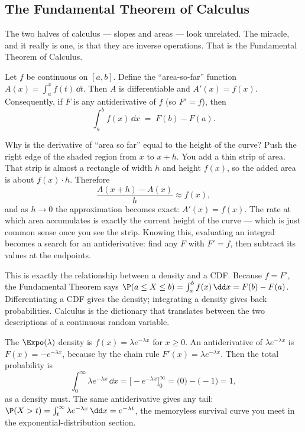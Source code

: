 \subsection{The Fundamental Theorem of Calculus}
\label{chAcla:ftc}

The two halves of calculus --- slopes and areas --- look unrelated. The miracle, and it really is
one, is that they are inverse operations. That is the Fundamental Theorem of Calculus.

\begin{theorem}
\label{chAcla:thm-ftc}
Let $f$ be continuous on $[a,b]$. Define the ``area-so-far'' function
$\displaystyle A(x)=\int_a^x f(t)\,\dd t$. Then $A$ is differentiable and $A'(x)=f(x)$. Consequently,
if $F$ is any antiderivative of $f$ (so $F'=f$), then
\[
  \int_a^b f(x)\,\dd x \;=\; F(b)-F(a).
\]
\end{theorem}

\begin{whybox}
Why is the derivative of ``area so far'' equal to the height of the curve? Push the right edge of the
shaded region from $x$ to $x+h$. You add a thin strip of area. That strip is almost a rectangle of
width $h$ and height $f(x)$, so the added area is about $f(x)\cdot h$. Therefore
\[
  \frac{A(x+h)-A(x)}{h}\approx f(x),
\]
and as $h\to 0$ the approximation becomes exact: $A'(x)=f(x)$. The rate at which area accumulates is
exactly the current height of the curve --- which is just common sense once you see the strip.
Knowing this, evaluating an integral becomes a search for an antiderivative: find any $F$ with
$F'=f$, then subtract its values at the endpoints.
\end{whybox}

This is exactly the relationship between a density and a CDF. Because $f=F'$, the Fundamental Theorem
says $\P(a\le X\le b)=\int_a^b f(x)\,\dd x = F(b)-F(a)$. Differentiating a CDF gives the density;
integrating a density gives back probabilities. Calculus is the dictionary that translates between the
two descriptions of a continuous random variable.

\begin{example}
\label{chAcla:ex-expo}
The $\Expo(\lambda)$ density is $f(x)=\lambda e^{-\lambda x}$ for $x\ge 0$. An antiderivative of
$\lambda e^{-\lambda x}$ is $F(x)=-e^{-\lambda x}$, because by the chain rule $F'(x)=\lambda
e^{-\lambda x}$. Then the total probability is
\[
  \int_0^\infty \lambda e^{-\lambda x}\,\dd x
  = \Big[-e^{-\lambda x}\Big]_0^\infty
  = \big(0\big)-\big(-1\big) = 1,
\]
as a density must. The same antiderivative gives any tail: $\P(X>t)=\int_t^\infty \lambda e^{-\lambda
x}\,\dd x = e^{-\lambda t}$, the memoryless survival curve you meet in the exponential-distribution
section.
\end{example}

